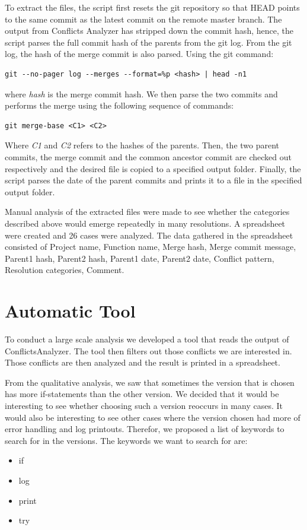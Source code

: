 To extract the files, the script first resets the git repository so that HEAD points to the same commit as the latest commit on the remote master branch. The output from Conflicts Analyzer has stripped down the commit hash, hence, the script parses the full commit hash of the parents from the git log. From the git log, the hash of the merge commit is also parsed. Using the git command:
\lstset{language=Bash}
\begin{lstlisting}[frame=single]
git --no-pager log --merges --format=%p <hash> | head -n1
\end{lstlisting}
where \textit{hash} is the merge commit hash. We then parse the two commits and performs the merge using the following sequence of commands:\\
\lstset{language=Bash,numbers=left,xleftmargin=2em,frame=single,framexleftmargin=1.5em}
\begin{lstlisting}[frame=single]
git merge-base <C1> <C2>
\end{lstlisting}
Where \textit{C1} and \textit{C2} refers to the hashes of the parents.  Then, the two parent commits, the merge commit and the common ancestor commit  are checked out respectively and the desired file is copied to a specified output folder. Finally, the script parses the date of the parent commits and prints it to a file in the specified output folder.

Manual analysis of the extracted files were made to see whether the categories described above would emerge repeatedly in many resolutions. A spreadsheet were created and 26 cases were analyzed. The data gathered in the spreadsheet consisted of Project name, Function name, Merge hash, Merge commit message, Parent1 hash, Parent2 hash, Parent1 date, Parent2 date, Conflict pattern, Resolution categories, Comment.

\section{Automatic Tool}
To conduct a large scale analysis we developed a tool that reads the output of ConflictsAnalyzer. The tool then filters out those conflicts we are interested in. Those conflicts are then analyzed and the result is printed in a spreadsheet.

From the qualitative analysis, we saw that sometimes the version that is chosen has more if-statements than the other version. We decided that it would be interesting to see whether choosing such a version reoccurs in many cases. It would also be interesting to see other cases where the version chosen had more of error handling and log printouts. Therefor, we proposed a list of keywords to search for in the versions. The keywords we want to search for are:
\begin{itemize}
\item if
\item log
\item print
\item try
\end{itemize}

